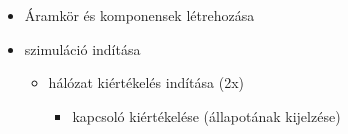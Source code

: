 {\vspace{-15pt}
\begin{itemize}
\setlength{\itemsep}{0cm}%
\setlength{\parskip}{0cm}%
\item Áramkör és komponensek létrehozása
\item szimuláció indítása
\begin{itemize}
\setlength{\itemsep}{0cm}%
\setlength{\parskip}{0cm}%
\item hálózat kiértékelés indítása (2x)
\begin{itemize}
\setlength{\itemsep}{0cm}%
\setlength{\parskip}{0cm}%
\item kapcsoló kiértékelése (állapotának kijelzése)

\end{itemize}
\end{itemize}
\end{itemize}}
